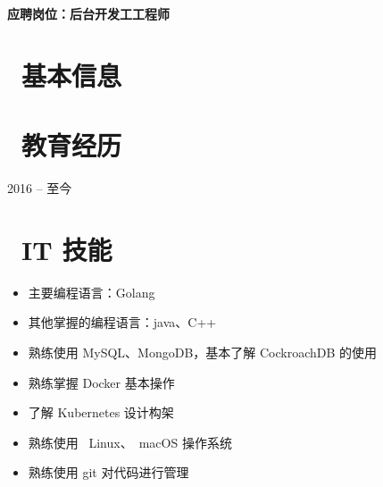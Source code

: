 \documentclass{resume}
\begin{document}

  \hfill \vspace{2mm} \par
\textbf{应聘岗位：后台开发⼯工程师}

\section{\faInfo\ 基本信息} \vspace{1mm}

{\phone {} \qquad\qquad\quad
\email {}
\vspace{2mm} \par
\github {} \qquad
\faLink {}}

\section{\faGraduationCap\ 教育经历} \vspace{1mm}

{2016 -- 至今}

\section{\faCogs\ IT 技能} \vspace{1mm}

\begin{itemize}[parsep=1ex]
  \item 主要编程语言：Golang
  \item 其他掌握的编程语言：java、C++
  \item 熟练使⽤ MySQL、MongoDB，基本了解 CockroachDB 的使用
  \item 熟练掌握 Docker 基本操作
  \item 了解 Kubernetes 设计构架
  \item 熟练使⽤ \faLinux\ {Linux}、\faApple\ {macOS} 操作系统
  \item 熟练使用 git 对代码进行管理
\end{itemize}
\end{document}
